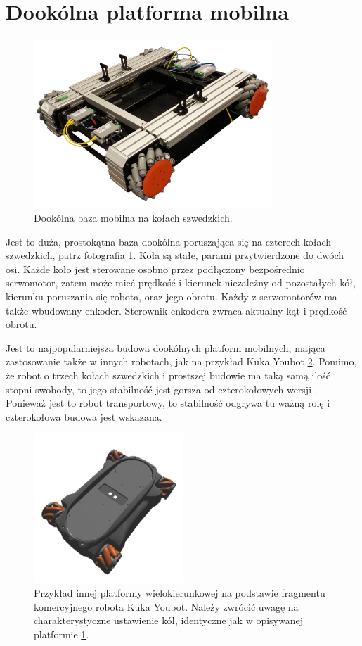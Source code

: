 \section{Dookólna platforma mobilna}
	\begin{figure}[H]
	\centering
	\includegraphics[width=0.8\textwidth]{graphics/base_photo.png}
	\caption{Dookólna baza mobilna na kołach szwedzkich.}
	\label{fig:base_photo}
	\end{figure} 

	Jest to duża, prostokątna baza dookólna poruszająca się na czterech kołach szwedzkich, patrz fotografia \ref{fig:base_photo}.
	Koła są stałe, parami przytwierdzone do dwóch osi.
	Każde koło jest sterowane osobno przez podłączony bezpośrednio serwomotor, zatem może mieć prędkość i kierunek niezależny od pozostałych kół, kierunku poruszania się robota, oraz jego obrotu.
	Każdy z serwomotorów ma także wbudowany enkoder.
	Sterownik enkodera zwraca aktualny kąt i prędkość obrotu.

	Jest to najpopularniejsza budowa dookólnych platform mobilnych, mająca zastosowanie także w innych robotach, jak na przykład Kuka Youbot \ref{fig:kuka_youbot}.
	Pomimo, że robot o trzech kołach szwedzkich i prostszej budowie ma taką samą ilość stopni swobody, to jego stabilność jest gorsza od czterokołowych wersji \cite{extra_axis}.
	Ponieważ jest to robot transportowy, to stabilność odgrywa tu ważną rolę i czterokołowa budowa jest wskazana.

	\begin{figure}[H]
	\centering
	\includegraphics[width=0.5\textwidth]{graphics/kuka_youbot.png}
	\caption{Przykład innej platformy wielokierunkowej na podstawie fragmentu komercyjnego robota Kuka Youbot. Należy zwrócić uwagę na charakterystyczne ustawienie kół, identyczne jak w opisywanej platformie \ref{fig:base_photo}.}
	\label{fig:kuka_youbot}
	\end{figure} 

